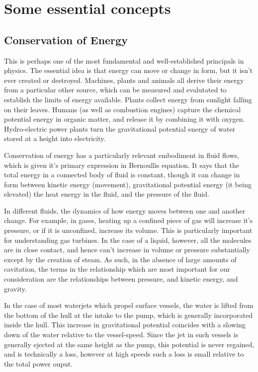 \documentclass{article}\usepackage[]{graphicx}\usepackage[]{color}
\begin{document}
\section{Some essential concepts}

\subsection{Conservation of Energy}

This is perhaps one of the most fundamental and well-established principals in physics.  The essential idea is that energy can move or change in form, but it isn't ever created or destroyed.  Machines, plants and animals all derive their energy from a particular other source, which can be measured and evalutated to establish the limits of energy available.  Plants collect energy from sunlight falling on their leaves. Humans (as well as combustion engines) capture the chemical potential energy in organic matter, and release it by combining it with oxygen.  Hydro-electric power plants turn the gravitational potential energy of water stored at a height into electricity.

Conservation of energy has a particularly relevant embodiment in fluid flows, which is given it's primary expression in Bernoullis equation.  It says that the total energy in a connected body of fluid is constant, though it can change in form between kinetic energy (movement), gravitational potential energy (it being elevated) the heat energy in the fluid, and the pressure of the fluid.

In different fluids, the dynamics of how energy moves between one and another change.  For example, in gases, heating up a confined piece of gas will increase it's pressure, or if it is unconfined, increase its volume. This is particularly important for understanding gas turbines. In the case of a liquid, however, all the molecules are in close contact, and hence can't increase in volume or pressure substantially except by the creation of steam. As such, in the absence of large amounts of cavitation, the terms in the relationship which are most important for our consideration are the relationships between pressure, and kinetic energy, and gravity.

In the case of most waterjets which propel surface vessels, the water is lifted from the bottom of the hull at the intake to the pump, which is generally incorporated inside the hull. This increase in gravitational potential coincides with a slowing down of the water relative to the vessel-speed. Since the jet in such vessels is generally ejected at the same height as the pump, this potential is never regained, and is technically a loss, however at high speeds such a loss is small relative to the total power ouput.
\end{document}
